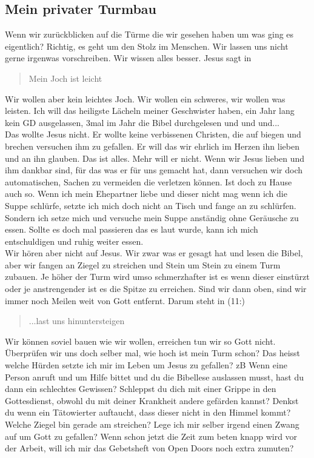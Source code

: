 \documentclass[14pt]{../../inc/mybib}
\newcommand{\q}[1]{\blockquote{#1}}
\begin{document}
    \subsection{Mein privater Turmbau}
    Wenn wir zurückblicken auf die Türme die wir gesehen haben um was ging es eigentlich? Richtig, es geht um den Stolz im Menschen. Wir lassen uns nicht gerne irgenwas vorschreiben. Wir wissen alles besser. Jesus sagt in  \q{Mein Joch ist leicht}. Wir wollen aber kein leichtes Joch. Wir wollen ein schweres, wir wollen was leisten. Ich will das heiligste Lächeln meiner Geschwister haben, ein Jahr lang kein GD ausgelassen, 3mal im Jahr die Bibel durchgelesen und und und...\\
    Das wollte Jesus nicht. Er wollte keine verbissenen Christen, die auf biegen und brechen versuchen ihm zu gefallen. Er will das wir ehrlich im Herzen ihn lieben und an ihn glauben. Das ist alles. Mehr will er nicht. Wenn wir Jesus lieben und ihm dankbar sind, für das was er für uns gemacht hat, dann versuchen wir doch automatischen, Sachen zu vermeiden die verletzen können. Ist doch zu Hause auch so. Wenn ich mein Ehepartner liebe und dieser nicht mag wenn ich die Suppe schlürfe, setzte ich mich doch nicht an Tisch und fange an zu schlürfen. Sondern ich setze mich und versuche mein Suppe anständig ohne Geräusche zu essen. Sollte es doch mal passieren das es laut wurde, kann ich mich entschuldigen und ruhig weiter essen.\\
    Wir hören aber nicht auf Jesus. Wir zwar was er gesagt hat und lesen die Bibel, aber wir fangen an Ziegel zu streichen und Stein um Stein zu einem Turm zubauen. Je höher der Turm wird umso schmerzhafter ist es wenn dieser einstürzt oder je anstrengender ist es die Spitze zu erreichen. Sind wir dann oben, sind wir immer noch Meilen weit von Gott entfernt. Darum steht in (11:) \q{...last uns hinuntersteigen}. Wir können soviel bauen wie wir wollen, erreichen tun wir so Gott nicht.\\
    Überprüfen wir uns doch selber mal, wie hoch ist mein Turm schon? Das heisst welche Hürden setzte ich mir im Leben um Jesus zu gefallen? zB Wenn eine Person anruft und um Hilfe bittet und du die Bibellese auslassen musst, hast du dann ein schlechtes Gewissen? Schleppst du dich mit einer Grippe in den Gottesdienst, obwohl du mit deiner Krankheit andere gefärden kannst? Denkst du wenn ein Tätowierter auftaucht, dass dieser nicht in den Himmel kommt?\\
    Welche Ziegel bin gerade am streichen? Lege ich mir selber irgend einen Zwang auf um Gott zu gefallen? Wenn schon jetzt die Zeit zum beten knapp wird vor der Arbeit, will ich mir das Gebetsheft von Open Doors noch extra zumuten?
\end{document}
